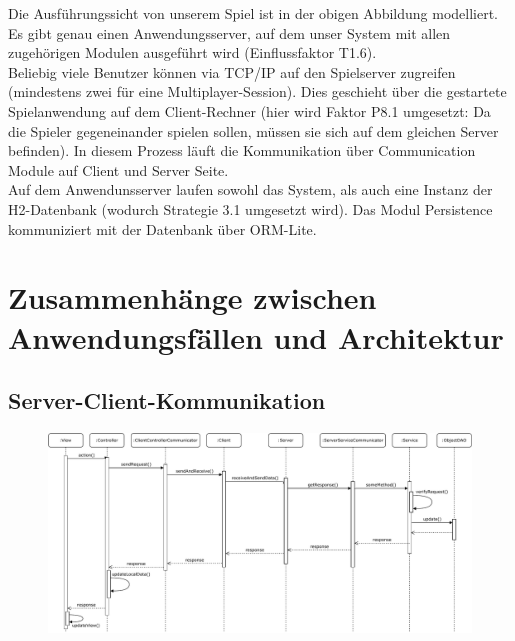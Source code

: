 \documentclass[fontsize=12pt,paper=a4,twoside]{scrartcl}
\begin{document}
Die Ausführungssicht von unserem Spiel ist in der obigen Abbildung modelliert. Es gibt genau einen Anwendungsserver, auf dem unser System mit allen zugehörigen Modulen ausgeführt wird (Einflussfaktor T1.6). \\

Beliebig viele Benutzer können via TCP/IP auf den Spielserver zugreifen (mindestens zwei für eine Multiplayer-Session). Dies geschieht über die gestartete Spielanwendung auf dem Client-Rechner (hier wird Faktor P8.1 umgesetzt: Da die Spieler gegeneinander spielen sollen, müssen sie sich auf dem gleichen Server befinden). In diesem Prozess läuft die Kommunikation über Communication Module auf Client und Server Seite. \\

Auf dem Anwendunsserver laufen sowohl das System, als auch eine Instanz der H2-Datenbank (wodurch Strategie 3.1 umgesetzt wird).
Das Modul Persistence kommuniziert mit der Datenbank über ORM-Lite.  \\ 





\section{Zusammenhänge zwischen Anwendungsfällen und Architektur}
 \label{sec:anwendungsfaelle}

\subsection{Server-Client-Kommunikation}

\begin{figure}[H]
\begin{center}
  \includegraphics[width=\linewidth]{UML/Server_client_Sequenzdiagramm.pdf}
\end{center}
\end{figure}
\end{document}
